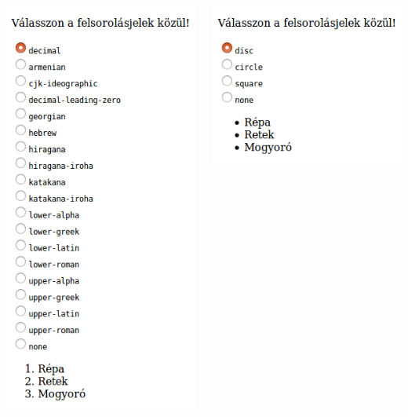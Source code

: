 %
\begin{frame}
  \begin{columns}[c]
      \begin{exampleblock}{}
        \begin{center}
          \includegraphics[width=.37\textwidth]{szamozott.png}
        \end{center}
      \end{exampleblock}
      \begin{exampleblock}{}
        \begin{center}
          \includegraphics[width=.7\textwidth]{nemszamozott.png}
        \end{center}
      \end{exampleblock}
  \end{columns} 
\end{frame}

